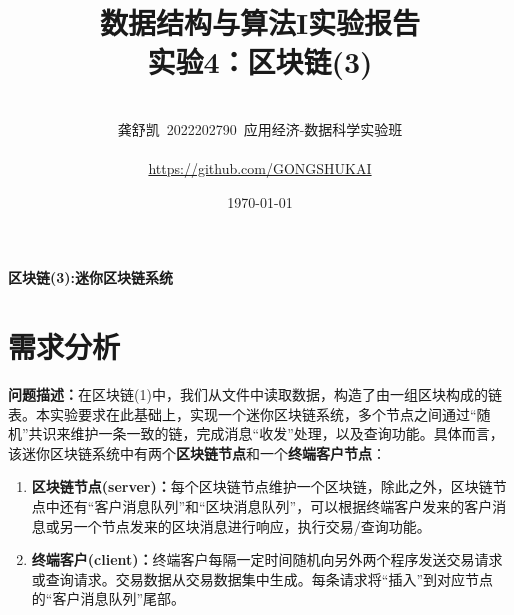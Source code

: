 \documentclass[10pt,a4paper]{article}
\begin{document}
	\title{{\Huge 数据结构与算法I实验报告{\large\linebreak\\}}{\huge 实验4：区块链(3)\linebreak\linebreak}}
	\vspace{3cm}
	\author{\\ \Large 龚舒凯\ 2022202790\ 应用经济-数据科学实验班\\
		\hfill\\
		\Large{\url{https://github.com/GONGSHUKAI}}\\
		\hfill}
	
	\date{\today}
	\maketitle
	\newpage
	\begin{center}
		{\huge \textbf{区块链(3):迷你区块链系统}}
	\end{center}
	\section{需求分析}
    \noindent \textbf{问题描述：}在区块链(1)中，我们从文件中读取数据，构造了由一组区块构成的链表。本实验要求在此基础上，实现一个迷你区块链系统，多个节点之间通过“随机”共识来维护一条一致的链，完成消息“收发”处理，以及查询功能。具体而言，该迷你区块链系统中有两个\textbf{区块链节点}和一个\textbf{终端客户节点}：
    \begin{enumerate}
        \item \textbf{区块链节点(server)：}每个区块链节点维护一个区块链，除此之外，区块链节点中还有“客户消息队列”和“区块消息队列”，可以根据终端客户发来的客户消息或另一个节点发来的区块消息进行响应，执行交易/查询功能。
        \item \textbf{终端客户(client)：}终端客户每隔一定时间随机向另外两个程序发送交易请求或查询请求。交易数据从交易数据集中生成。每条请求将“插入”到对应节点的“客户消息队列”尾部。
    \end{enumerate}
\end{document}
